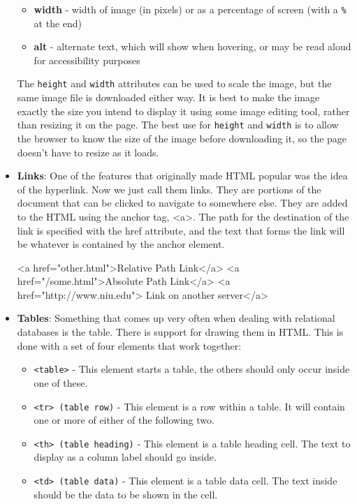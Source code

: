\documentclass{report}
\begin{document}
\begin{itemize}
\begin{itemize}
            \item \textbf{width} - width of image (in pixels) or as a percentage of screen (with a \texttt{\%} at the end)
            \item \textbf{alt} - alternate text, which will show when hovering, or may be read aloud for accessibility purposes
        \end{itemize}
        The \texttt{height} and \texttt{width} attributes can be used to scale the image, but the same image file is downloaded either way. It is best to make the image exactly the size you intend to display it using some image editing tool, rather than resizing it on the page. The best use for \texttt{height} and \texttt{width} is to allow the browser to know the size of the image before downloading it, so the page doesn't have to resize as it loads.
    \item \textbf{Links}: One of the features that originally made HTML popular was the idea of the hyperlink. Now we just call them links.
        \bigbreak \noindent 
        They are portions of the document that can be clicked to navigate to somewhere else.
        \bigbreak \noindent 
        They are added to the HTML using the anchor tag, <a>. The path for the destination of the link is specified with the href attribute, and the text that forms the link will be whatever is contained by the anchor element.
        \bigbreak \noindent 
        \begin{htmlcode}
            <a href="other.html">Relative Path Link</a>
            <a href="/some.html">Absolute Path Link</a>
            <a href="http://www.niu.edu"> Link on another server</a>
        \end{htmlcode}
    \item \textbf{Tables}: Something that comes up very often when dealing with relational databases is the table. There is support for drawing them in HTML. This is done with a set of four elements that work together:
        \begin{itemize}
            \item \texttt{<table>} - This element starts a table, the others should only occur inside one of these.
            \item \texttt{<tr> (table row)} - This element is a row within a table. It will contain one or more of either of the following two.
            \item \texttt{<th> (table heading)} - This element is a table heading cell. The text to display as a column label should go inside.
            \item \texttt{<td> (table data)} - This element is a table data cell. The text inside should be the data to be shown in the cell.

\end{itemize}
\end{itemize}
\end{document}
